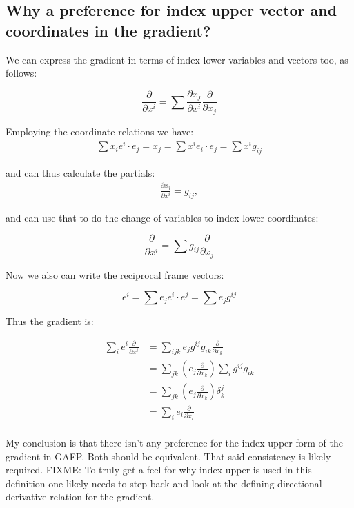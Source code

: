
\subsection{Why a preference for index upper vector and coordinates in the gradient? }

We can express the gradient in terms of index lower variables and vectors too, as follows:

\begin{equation*}
\frac{\partial}{\partial x^i} = \sum \frac{\partial x_j}{\partial x^i} \frac{\partial}{\partial x_j}
\end{equation*}

Employing the coordinate relations we have:
\begin{align*}
\sum x_i e^i \cdot e_j = x_j = \sum x^i e_i \cdot e_j = \sum x^i g_{ij}
\end{align*}

and can thus calculate the partials:
\begin{align*}
\frac{\partial x_j}{\partial x^i} = g_{ij},
\end{align*}

and can use that to do the change of variables to index lower coordinates:

\begin{equation*}
\frac{\partial}{\partial x^i} = \sum g_{ij} \frac{\partial}{\partial x_j}
\end{equation*}

Now we also can write the reciprocal frame vectors:

\begin{equation*}
e^i = \sum e_j e^i \cdot e^j = \sum e_j g^{ij}
\end{equation*}

Thus the gradient is:

\begin{align*}
\sum_i e^i \frac{\partial}{\partial x^i}
&= \sum_{ijk} e_j g^{ij} g_{ik} \frac{\partial}{\partial x_k} \\
&= \sum_{jk} \left(e_j \frac{\partial}{\partial x_k} \right) \sum_i g^{ij} g_{ik} \\
&= \sum_{jk} \left(e_j \frac{\partial}{\partial x_k} \right) \delta_k^j \\
&= \sum_{i} e_i \frac{\partial}{\partial x_i} \\ 
\end{align*}

My conclusion is that there isn't any preference for the index upper form of the gradient in GAFP.  Both should be equivalent.  That said consistency is likely required.  FIXME: To truly get a feel for why index upper is used in this definition one likely needs to step back and look at the defining directional derivative relation for the gradient.
